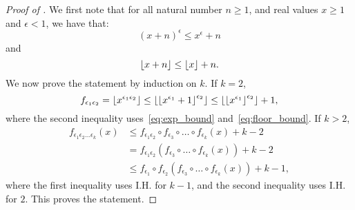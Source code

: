     \begin{proof}[Proof of ]
        We first note that for all natural number $n \geq 1$, and real values $x \geq 1$ and $\epsilon < 1$,
        we have that:
        \begin{equation} \label{eq:exp_bound}
            (x+n)^{\epsilon} \leq x^{\epsilon} + n
        \end{equation}
        and
        \begin{equation} \label{eq:floor_bound}
            \left\lfloor x+n \right\rfloor \leq \left\lfloor x \right\rfloor + n.
        \end{equation}
        We now prove the statement by induction on $k$.
        If $k=2$,
        \[
            f_{\epsilon_1 \epsilon_2} = \left\lfloor x^{\epsilon_1 \epsilon_2} \right\rfloor
                \leq \left\lfloor \left\lfloor x^{\epsilon_1}+1 \right\rfloor^{\epsilon_2} \right\rfloor
                \leq \left\lfloor \left\lfloor x^{\epsilon_1} \right\rfloor^{\epsilon_2} \right\rfloor + 1,
        \]
        where the second inequality uses~\eqref{eq:exp_bound} and~\eqref{eq:floor_bound}.
        If $k > 2$,
        \begin{align*}
            f_{\epsilon_1 \epsilon_2 \dots \epsilon_k} (x)
                & \leq f_{\epsilon_1 \epsilon_2} \circ f_{\epsilon_3} \circ \dots \circ f_{\epsilon_{k}}(x) + k - 2 \\
                & = f_{\epsilon_1 \epsilon_2} (f_{\epsilon_3} \circ \dots \circ f_{\epsilon_{k}}(x)) + k - 2 \\
                & \leq f_{\epsilon_1} \circ f_{\epsilon_2} (f_{\epsilon_3} \circ \dots \circ f_{\epsilon_{k}}(x)) + k - 1,
        \end{align*}
        where the first inequality uses I.H. for $k-1$, and the second inequality uses I.H. for $2$.
        This proves the statement.
    \end{proof}


